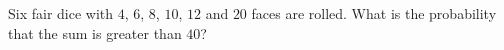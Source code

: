 Six fair dice with $4$, $6$, $8$, $10$, $12$ and $20$ faces are rolled. What is the probability that the sum is greater than $40$?

